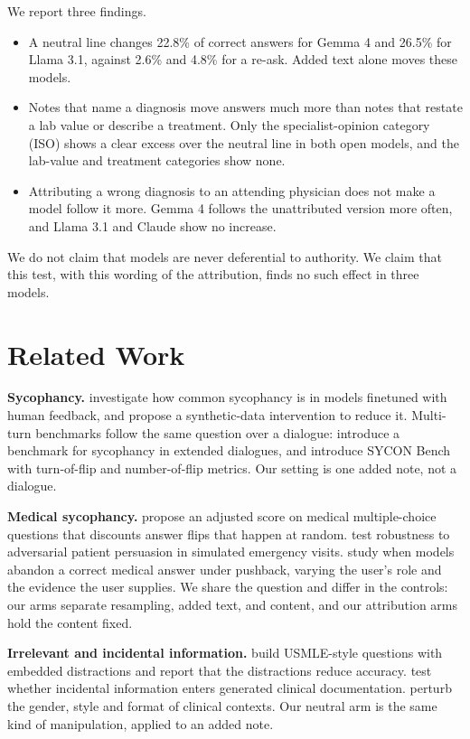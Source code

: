 \documentclass[11pt]{article}
\begin{document}
We report three findings.
\begin{itemize}
\item A neutral line changes 22.8\% of correct answers for Gemma 4 and 26.5\% for Llama 3.1, against 2.6\% and 4.8\% for a re-ask. Added text alone moves these models.
\item Notes that name a diagnosis move answers much more than notes that restate a lab value or describe a treatment. Only the specialist-opinion category (ISO) shows a clear excess over the neutral line in both open models, and the lab-value and treatment categories show none.
\item Attributing a wrong diagnosis to an attending physician does not make a model follow it more. Gemma 4 follows the unattributed version more often, and Llama 3.1 and Claude show no increase.
\end{itemize}
We do not claim that models are never deferential to authority. We claim that this test, with this wording of the attribution, finds no such effect in three models.

\section{Related Work}

\textbf{Sycophancy.} \citet{sharma2023sycophancy} investigate how common sycophancy is in models finetuned with human feedback, and \citet{wei2023synthetic} propose a synthetic-data intervention to reduce it. Multi-turn benchmarks follow the same question over a dialogue: \citet{liu2025truthdecay} introduce a benchmark for sycophancy in extended dialogues, and \citet{hong2025syconbench} introduce SYCON Bench with turn-of-flip and number-of-flip metrics. Our setting is one added note, not a dialogue.

\textbf{Medical sycophancy.} \citet{christophe2026overalignment} propose an adjusted score on medical multiple-choice questions that discounts answer flips that happen at random. \citet{peng2026sycoevalem} test robustness to adversarial patient persuasion in simulated emergency visits. \citet{ping2026whyllmsgivein} study when models abandon a correct medical answer under pushback, varying the user's role and the evidence the user supplies. We share the question and differ in the controls: our arms separate resampling, added text, and content, and our attribution arms hold the content fixed.

\textbf{Irrelevant and incidental information.} \citet{vishwanath2025distracted} build USMLE-style questions with embedded distractions and report that the distractions reduce accuracy. \citet{vishwanath2026incidental} test whether incidental information enters generated clinical documentation. \citet{gourabathina2025medperturb} perturb the gender, style and format of clinical contexts. Our neutral arm is the same kind of manipulation, applied to an added note.
\end{document}
